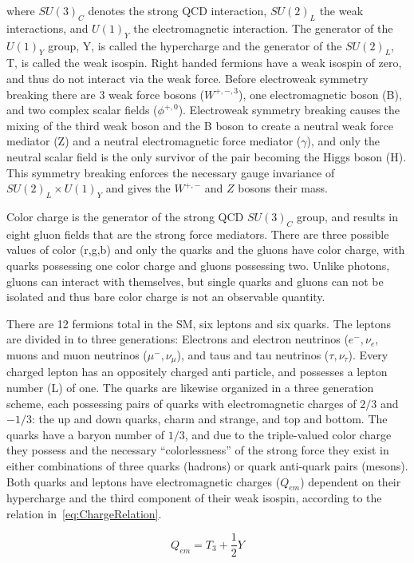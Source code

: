 where $SU(3)_{C}$ denotes the strong QCD interaction, $SU(2)_{L}$ the weak interactions, and $U(1)_{Y}$ the electromagnetic interaction.  The generator of the $U(1)_{Y}$ group, Y, is called the hypercharge and the generator of the $SU(2)_{L}$, T, is called the weak isospin.  Right handed fermions have a weak isospin of zero, and thus do not interact via the weak force.  Before electroweak symmetry breaking there are 3 weak force bosons ($W^{+,-,3}$), one electromagnetic boson (B), and two complex scalar fields ($\phi^{+,0}$).  Electroweak symmetry breaking causes the mixing of the third weak boson and the B boson to create a neutral weak force mediator (Z) and a neutral electromagnetic force mediator ($\gamma$), and only the neutral scalar field is the only survivor of the pair becoming the Higgs boson (H).  This symmetry breaking enforces the necessary gauge invariance of $SU(2)_{L} \times U(1)_{Y}$ and gives the $W^{+,-}$ and $Z$ bosons their mass.  

Color charge is the generator of the strong QCD $SU(3)_{C}$ group, and results in eight gluon fields that are the strong force mediators.  There are three possible values of color (r,g,b) and only the quarks and the gluons have color charge, with quarks possessing one color charge and gluons possessing two.  Unlike photons, gluons can interact with themselves, but single quarks and gluons can not be isolated and thus bare color charge is not an observable quantity.   

There are 12 fermions total in the SM, six leptons and six quarks.  The leptons are divided in to three generations: Electrons and electron neutrinos ($e^{-}, \nu_{e}$, muons and muon neutrinos ($\mu^{-}, \nu_{\mu}$), and taus and tau neutrinos ($\tau, \nu_{\tau}$).  Every charged lepton has an oppositely charged anti particle, and possesses a lepton number (L) of one.  The quarks are likewise organized in a three generation scheme, each possessing pairs of quarks with electromagnetic charges of $2/3$ and $-1/3$: the up and down quarks, charm and strange, and top and bottom.  The quarks have a baryon number of $1/3$, and due to the triple-valued color charge they possess and the necessary ``colorlessness'' of the strong force they exist in either combinations of three quarks (hadrons) or quark anti-quark pairs (mesons).  Both quarks and leptons have electromagnetic charges ($Q_{em}$) dependent on their hypercharge and the third component of their weak isospin, according to the relation in~\ref{eq:ChargeRelation}.


\begin{equation}
Q_{em} = T_{3} + \frac{1}{2}Y
\label{eq:ChargeRelation}
\end{equation}

